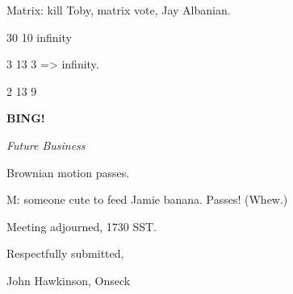 \documentclass[12pt]{article}
\newcommand{\bing}{{\bf BING!} }
\newcommand{\goto}[1]{\bing \vskip 12pt \centerline{{\em{#1}}}}
\begin{document}
Matrix: kill Toby, matrix vote, Jay Albanian.

30 10 infinity

3 13 3 => infinity.

2 13 9

\goto{Future Business}

Brownian motion passes.

M: someone cute to feed Jamie banana. Passes! (Whew.)

\vspace{12pt}

\noindent
Meeting adjourned, 1730 SST.

\vspace{18pt}

\centerline{Respectfully submitted,}
\centerline{John Hawkinson, Onseck}
\end{document}
